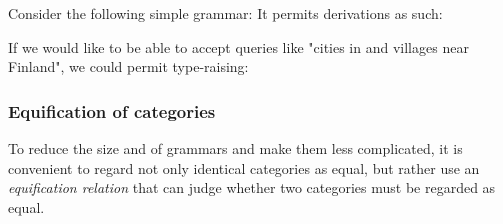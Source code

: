 \documentclass[main.tex]{subfiles}
\begin{document}
\begin{example}
    Consider the following simple grammar:
    It permits derivations as such:

    If we would like to be able to accept queries like "cities in and villages
    near Finland", we could permit type-raising:

\end{example}

\subsubsection{Equification of categories}
\label{hack:equification}
To reduce the size and of grammars and make them less complicated,
it is convenient to regard
not only identical categories as equal, but rather use an \emph{equification
relation} that can judge whether two categories must be regarded as equal.
\end{document}
